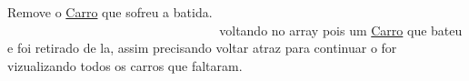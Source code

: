 Remove o \mbox{\hyperlink{class_carro}{Carro}} que sofreu a batida. ~\newline
~\newline
~\newline
~\newline
~\newline
~\newline
~\newline
~\newline
~\newline
~\newline
~\newline
~\newline
~\newline
~\newline
~\newline
~\newline
~\newline
~\newline
~\newline
~\newline
~\newline
~\newline
~\newline
~\newline
~\newline
~\newline
~\newline
~\newline
~\newline
~\newline
~\newline
~\newline
~\newline
~\newline
~\newline
~\newline
~\newline
~\newline
~\newline
~\newline
~\newline
~\newline
~\newline
 voltando no array pois um \mbox{\hyperlink{class_carro}{Carro}} que bateu e foi retirado de la, assim precisando voltar atraz para continuar o for vizualizando todos os carros que faltaram. ~\newline
~\newline
~\newline
~\newline
